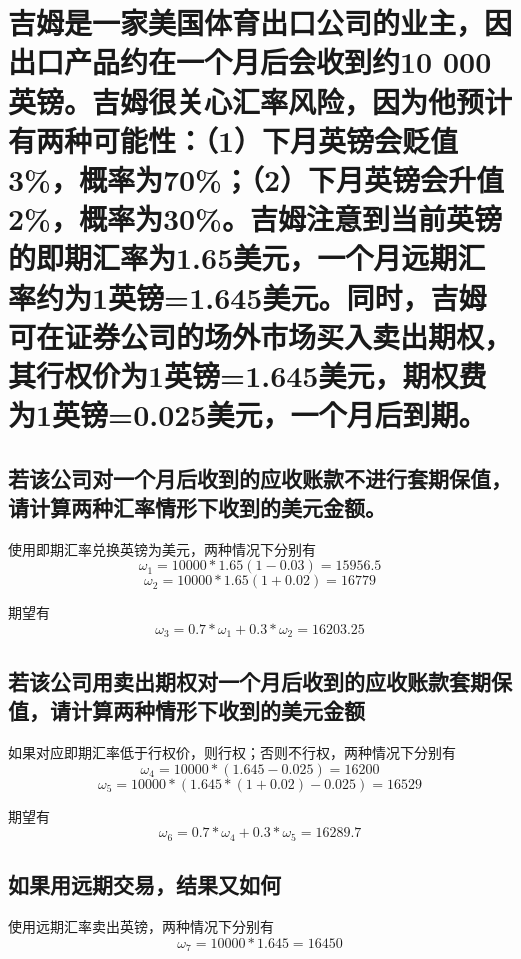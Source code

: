 \documentclass[UTF8]{ctexart}
\begin{document}
\section{吉姆是一家美国体育出口公司的业主，因出口产品约在一个月后会收到约10 000英镑。吉姆很关心汇率风险，因为他预计有两种可能性：（1）下月英镑会贬值3\%，概率为70\%；（2）下月英镑会升值2\%，概率为30\%。吉姆注意到当前英镑的即期汇率为1.65美元，一个月远期汇率约为1英镑=1.645美元。同时，吉姆可在证券公司的场外市场买入卖出期权，其行权价为1英镑=1.645美元，期权费为1英镑=0.025美元，一个月后到期。}
\subsection{若该公司对一个月后收到的应收账款不进行套期保值，请计算两种汇率情形下收到的美元金额。}
使用即期汇率兑换英镑为美元，两种情况下分别有
    \begin{equation*}
        \omega_1 = 10000 * 1.65(1-0.03) = 15956.5
    \end{equation*}
    \begin{equation*}
        \omega_2 = 10000 * 1.65(1 + 0.02) = 16779
    \end{equation*}
    \par 期望有\begin{equation*}
        \omega_3 = 0.7 * \omega_1 + 0.3 * \omega_2 = 16203.25
    \end{equation*}
\subsection{若该公司用卖出期权对一个月后收到的应收账款套期保值，请计算两种情形下收到的美元金额}
如果对应即期汇率低于行权价，则行权；否则不行权，两种情况下分别有
    \begin{equation*}
        \omega_4 = 10000 *(1.645-0.025) = 16200
    \end{equation*}
    \begin{equation*}
        \omega_5 = 10000 * (1.645* (1 + 0.02) - 0.025) = 16529
    \end{equation*}
    \par 期望有
    \begin{equation*}
        \omega_6 = 0.7 * \omega_4 + 0.3 * \omega_5 = 16289.7
    \end{equation*}
\subsection{如果用远期交易，结果又如何}
使用远期汇率卖出英镑，两种情况下分别有    
\begin{equation*}
        \omega_7 = 10000 *1.645 = 16450
    \end{equation*}
\end{document}
